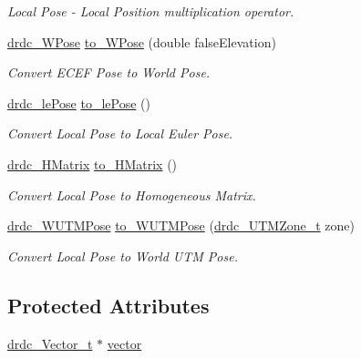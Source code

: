 \begin{CompactItemize}
\begin{CompactList}\small\item\em Local Pose - Local Position multiplication operator. \item\end{CompactList}\item 
\hyperlink{classdrdc__WPose}{drdc\_\-WPose} \hyperlink{classdrdc__lPose_62422847e77d7bfccb2c2c00d5cb8f44}{to\_\-WPose} (double falseElevation)
\begin{CompactList}\small\item\em Convert ECEF Pose to World Pose. \item\end{CompactList}\item 
\hyperlink{classdrdc__lePose}{drdc\_\-lePose} \hyperlink{classdrdc__lPose_d56ee6ffecee2d6f760a2fca99e2b503}{to\_\-lePose} ()
\begin{CompactList}\small\item\em Convert Local Pose to Local Euler Pose. \item\end{CompactList}\item 
\hyperlink{classdrdc__HMatrix}{drdc\_\-HMatrix} \hyperlink{classdrdc__lPose_7461c5f2274e0fa6c3ade454e44c74cf}{to\_\-HMatrix} ()
\begin{CompactList}\small\item\em Convert Local Pose to Homogeneous Matrix. \item\end{CompactList}\item 
\hyperlink{classdrdc__WUTMPose}{drdc\_\-WUTMPose} \hyperlink{classdrdc__lPose_1e5f7f1156fd80a1b41aa1e11e56dab4}{to\_\-WUTMPose} (\hyperlink{structdrdc__UTMZone__t}{drdc\_\-UTMZone\_\-t} zone)
\begin{CompactList}\small\item\em Convert Local Pose to World UTM Pose. \item\end{CompactList}\end{CompactItemize}
\subsection*{Protected Attributes}
\begin{CompactItemize}
\item 
\hyperlink{structdrdc__Vector__t}{drdc\_\-Vector\_\-t} $\ast$ \hyperlink{classdrdc__lPose_92a783818add679fa656ffc4913c71ce}{vector}
\end{CompactItemize}


